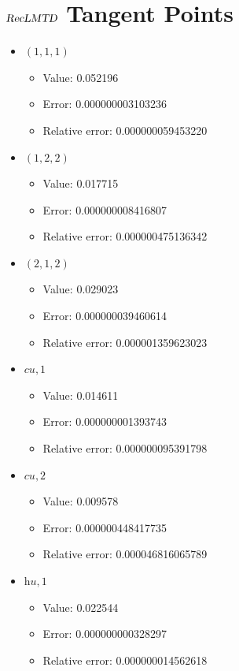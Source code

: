 \documentclass{article}%
\begin{document}
\section{$\textsl{RecLMTD}$ Tangent Points}%
\thispagestyle{plain}%
\begin{itemize}%
	\item $(1, 1, 1)$%
	\begin{itemize}%
		\item Value: 0.052196%
		\item Error: 0.000000003103236%
		\item Relative error: 0.000000059453220%
	\end{itemize}%
	\item $(1, 2, 2)$%
	\begin{itemize}%
		\item Value: 0.017715%
		\item Error: 0.000000008416807%
		\item Relative error: 0.000000475136342%
	\end{itemize}%
	\item $(2, 1, 2)$%
	\begin{itemize}%
		\item Value: 0.029023%
		\item Error: 0.000000039460614%
		\item Relative error: 0.000001359623023%
	\end{itemize}%
	\item $\textit{cu},1$%
	\begin{itemize}%
		\item Value: 0.014611%
		\item Error: 0.000000001393743%
		\item Relative error: 0.000000095391798%
	\end{itemize}%
	\item $\textit{cu},2$%
	\begin{itemize}%
		\item Value: 0.009578%
		\item Error: 0.000000448417735%
		\item Relative error: 0.000046816065789%
	\end{itemize}%
	\item $\textit{hu},1$%
	\begin{itemize}%
		\item Value: 0.022544%
		\item Error: 0.000000000328297%
		\item Relative error: 0.000000014562618%
	\end{itemize}%
\end{itemize}%
\end{document}
